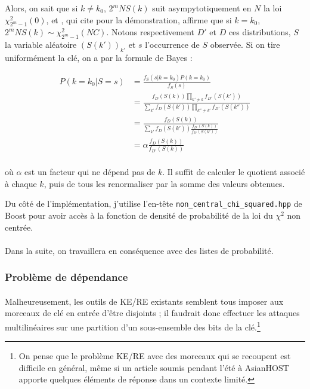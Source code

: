 \documentclass{scrartcl}
\begin{document}
Alors, on sait que si $k\neq k_0$, $2^mNS(k)$ suit asympytotiquement en $N$ la loi $\chi^2_{2^m-1}(0)$,
et \cite{TheseHermelin}, qui cite \cite{refDeHermelin} pour la démonstration, affirme
que si $k=k_0$, $2^mNS(k)\sim \chi^2_{2^m-1}(NC)$. Notons
respectivement $D'$ et $D$ ces distributions, $S$ la variable aléatoire $(S(k'))_{k'}$ et $s$ l'occurrence de $S$ observée. 
Si on tire uniformément la clé, on a par la formule de Bayes :

\begin{align*}
	P(k=k_0|S=s)&=\frac{f_S(s|k=k_0)P(k=k_0)}{f_S(s)}\\
		    &=\frac{f_D(S(k)) \prod_{k'\neq k}f_{D'}(S(k'))}{\sum_{k'}f_D(S(k'))\prod_{k''\neq k'} f_{D'}(S(k''))}\\
		    &=\frac{f_D(S(k))}{\sum_{k'} f_D(S(k'))\frac{f_{D'}(S(k))}{f_{D'}(S(k'))}}\\
		    &=\alpha \frac{f_D(S(k))}{f_{D'}(S(k))}\\
\end{align*}

où $\alpha$ est un facteur qui ne dépend pas de $k$. Il suffit de calculer le quotient associé à chaque $k$, puis de tous
les renormaliser par la somme des valeurs obtenues.

Du côté de l'implémentation, j'utilise l'en-tête \texttt{non\_central\_chi\_squared.hpp} de Boost pour
avoir accès à la fonction de densité de probabilité de la loi du $\chi^2$ non centrée.

\paragraph*{}
Dans la suite, on travaillera en conséquence avec des listes de probabilité.

\subsubsection{Problème de dépendance}

\paragraph*{}
Malheureusement, les outils de KE/RE existants semblent tous imposer aux morceaux de clé en entrée d'être disjoints ; il
faudrait donc effectuer les attaques multilinéaires sur une partition d'un sous-ensemble des bits de la clé.\footnote{On
pense que le problème KE/RE avec des morceaux qui se recoupent est difficile en général, même si un article
soumis pendant l'été à AsianHOST apporte quelques éléments de réponse dans un contexte limité.}
\end{document}
